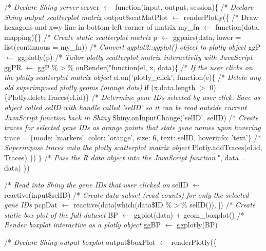 \documentclass[parskip=full]{bmcart}
\begin{document}
\DontPrintSemicolon
\begin{algorithm}[H]
\SetAlgoLined
{}

/* \textit{Declare Shiny server}\;
server $\leftarrow$ function(input, output, session)\{\;
\Indp/* \textit{Declare Shiny output scatterplot matrix}\;
output\$scatMatPlot $\leftarrow$ renderPlotly(\{\;
\Indp\Indp/* Draw hexagons and x=y line in bottom-left corner of matrix\;
my\_fn $\leftarrow$ function(data, mapping)\{\}\;
/* \textit{Create static scatterplot matrix}\;
p $\leftarrow$ ggpairs(data, lower = list(continuous = my\_fn))\;
/* \textit{Convert ggplot2::ggplot() object to plotly object}\;
ggP $\leftarrow$ ggplotly(p)\;
/* \textit{Tailor plotly scatterplot matrix interactivity with JavaScript}\;
ggPR $\leftarrow$ ggP \%$>$\% onRender("function(el, x, data)\{\;
\Indp/* \textit{If the user clicks on the plotly scatterplot matrix object}\;
el.on('plotly\_click', function(e)\{\;
\Indp/* \textit{Delete any old superimposed plotly geoms (orange dots)}\;
if (x.data.length $>$ 0)\{Plotly.deleteTraces(el.id)\}\;
/* \textit{Determine gene IDs selected by user click. Save as object called selID with handle called 'selID' so it can be read outside current JavaScript function back in Shiny}\;
Shiny.onInputChange('selID', selID)\;
/* \textit{Create traces for selected gene IDs as orange points that state gene names upon hovering}\;
trace = \{mode: 'markers', color: 'orange', size: 6, text: selID, hoverinfo: 'text'\}\;
/* \textit{Superimpose traces onto the plotly scatterplot matrix object}\;
Plotly.addTraces(el.id, Traces)\;
\Indm\})\;
\Indm\}\;
\Indm/* \textit{Pass the R data object into the JavaScript function}\;
", data = data)\;
\Indm\})\;

\BlankLine

/* \textit{Read into Shiny the gene IDs that user clicked on}\;
selID $\leftarrow$ reactive(input\$selID)\;
/* \textit{Create data subset (read counts) for only the selected gene IDs}\;
pcpDat $\leftarrow$ reactive(data[which(data\$ID \%$>$\% selID()), ])\;
/* \textit{Create static box plot of the full dataset}\;
BP $\leftarrow$ ggplot(data) $+$ geom\_boxplot()\;
/* \textit{Render boxplot interactive as a plotly object}\;
ggBP $\leftarrow$ ggplotly(BP)\;

\BlankLine

/* \textit{Declare Shiny output boxplot}\;
output\$boxPlot $\leftarrow$ renderPlotly(\{\;


\end{algorithm}
\end{document}

